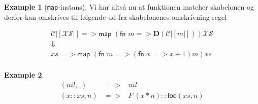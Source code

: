\documentclass[oneside]{memoir}
\theoremstyle{definition}
\newtheorem{example}{Example}
\begin{document}
\begin{example}[\texttt{map}-instans]
  Vi har altså nu at funktionen matcher skabelonen og derfor kan omskrives til
  følgende ud fra skabelonenes omskrivning regel

  \begin{eqnarray*}[c]
      \mathcal{C}|[\mathcal{X\!S}|] => \textsf{map } \left( \textsf{fn } m =>
    \mathbf{D}\left( \mathcal{C}|[m|] \right) \right) \mathcal{X\!S} \\
  \Downarrow \\
  xs => \textsf{map } \left( \textsf{fn } m =>
    \left( \textsf{fn } x => x + 1 \right) m \right) xs \\
  \end{eqnarray*}

\end{example}


\begin{example}
  \begin{eqnarray*}
    (nil, \_) &=>& nil\\
    (x::xs, n) &=>& F\ (x * n) :: \mathsf{foo} (xs, n)\\
  \end{eqnarray*}
\end{example}
\end{document}
